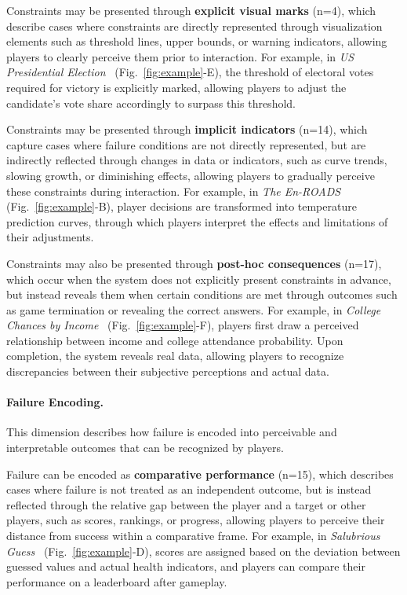 Constraints may be presented through \textbf{explicit visual marks} (n=4), which describe cases where constraints are directly represented through visualization elements such as threshold lines, upper bounds, or warning indicators, allowing players to clearly perceive them prior to interaction. For example, in \textit{US Presidential Election}~\cite{USPresidentialElectiony} (Fig.~\ref{fig:example}-E), the threshold of electoral votes required for victory is explicitly marked, allowing players to adjust the candidate's vote share accordingly to surpass this threshold.

Constraints may be presented through \textbf{implicit indicators} (n=14), which capture cases where failure conditions are not directly represented, but are indirectly reflected through changes in data or indicators, such as curve trends, slowing growth, or diminishing effects, allowing players to gradually perceive these constraints during interaction. For example, in \textit{The En-ROADS}~\cite{TheEn-ROADS} (Fig.~\ref{fig:example}-B), player decisions are transformed into temperature prediction curves, through which players interpret the effects and limitations of their adjustments.

Constraints may also be presented through \textbf{post-hoc consequences} (n=17), which occur when the system does not explicitly present constraints in advance, but instead reveals them when certain conditions are met through outcomes such as game termination or revealing the correct answers. For example, in \textit{College Chances by Income}~\cite{CollegeChancesbyIncome} (Fig.~\ref{fig:example}-F), players first draw a perceived relationship between income and college attendance probability. Upon completion, the system reveals real data, allowing players to recognize discrepancies between their subjective perceptions and actual data.

\paragraph{Failure Encoding.}
This dimension describes how failure is encoded into perceivable and interpretable outcomes that can be recognized by players.

Failure can be encoded as \textbf{comparative performance} (n=15), which describes cases where failure is not treated as an independent outcome, but is instead reflected through the relative gap between the player and a target or other players, such as scores, rankings, or progress, allowing players to perceive their distance from success within a comparative frame. For example, in \textit{Salubrious Guess}~\cite{SalubriousGuess} (Fig.~\ref{fig:example}-D), scores are assigned based on the deviation between guessed values and actual health indicators, and players can compare their performance on a leaderboard after gameplay.

